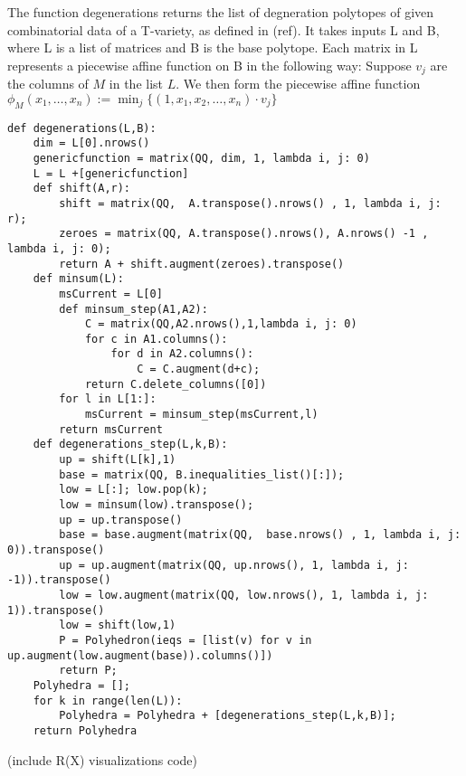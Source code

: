 The function degenerations returns the list of degneration polytopes of given combinatorial data of a T-variety, as defined in (ref). It takes inputs L and B, where L is a list of matrices and B is the base polytope. Each matrix in L represents a piecewise affine function on B in the following way: Suppose \(v_j\) are the columns of \(M\) in the list \(L\). We then form the piecewise affine function \(\phi_M(x_1,\dots,x_n) := \min_j \{ (1,x_1,x_2,\dots,x_n) \cdot v_j \} \)

\begin{lstlisting}
def degenerations(L,B):
    dim = L[0].nrows()
    genericfunction = matrix(QQ, dim, 1, lambda i, j: 0)
    L = L +[genericfunction]
    def shift(A,r):
        shift = matrix(QQ,  A.transpose().nrows() , 1, lambda i, j: r);
        zeroes = matrix(QQ, A.transpose().nrows(), A.nrows() -1 , lambda i, j: 0);
        return A + shift.augment(zeroes).transpose()
    def minsum(L):
        msCurrent = L[0]
        def minsum_step(A1,A2):
            C = matrix(QQ,A2.nrows(),1,lambda i, j: 0)
            for c in A1.columns():
                for d in A2.columns():
                    C = C.augment(d+c);
            return C.delete_columns([0])
        for l in L[1:]:
            msCurrent = minsum_step(msCurrent,l)
        return msCurrent
    def degenerations_step(L,k,B):
        up = shift(L[k],1)
        base = matrix(QQ, B.inequalities_list()[:]);
        low = L[:]; low.pop(k);
        low = minsum(low).transpose();
        up = up.transpose()
        base = base.augment(matrix(QQ,  base.nrows() , 1, lambda i, j: 0)).transpose()
        up = up.augment(matrix(QQ, up.nrows(), 1, lambda i, j: -1)).transpose()
        low = low.augment(matrix(QQ, low.nrows(), 1, lambda i, j: 1)).transpose()
        low = shift(low,1)
        P = Polyhedron(ieqs = [list(v) for v in up.augment(low.augment(base)).columns()])
        return P;
    Polyhedra = [];
    for k in range(len(L)):
        Polyhedra = Polyhedra + [degenerations_step(L,k,B)];
    return Polyhedra
\end{lstlisting}
(include R(X) visualizations code)
